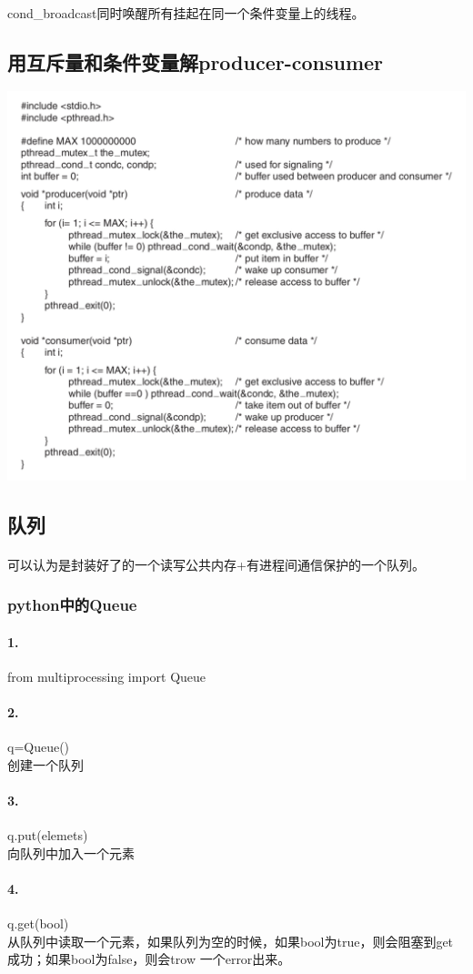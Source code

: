 \documentclass[12pt]{article}
\begin{document}
\begin{CJK}{UTF8}{gbsn}
\paragraph{}cond\_broadcast同时唤醒所有挂起在同一个条件变量上的线程。
\subsection{用互斥量和条件变量解producer-consumer}
\includegraphics[width=8in]{mutex.png}

\subsection{队列}
\paragraph{}可以认为是封装好了的一个读写公共内存+有进程间通信保护的一个队列。
\subsubsection{python中的Queue}
\paragraph{1.}from multiprocessing import Queue
\paragraph{2.}q=Queue()
\\创建一个队列	
\paragraph{3.}q.put(elemets)
\\向队列中加入一个元素
\paragraph{4.}q.get(bool)
\\从队列中读取一个元素，如果队列为空的时候，如果bool为true，则会阻塞到get成功；如果bool为false，则会trow 一个error出来。







\end{CJK}
\end{document}
